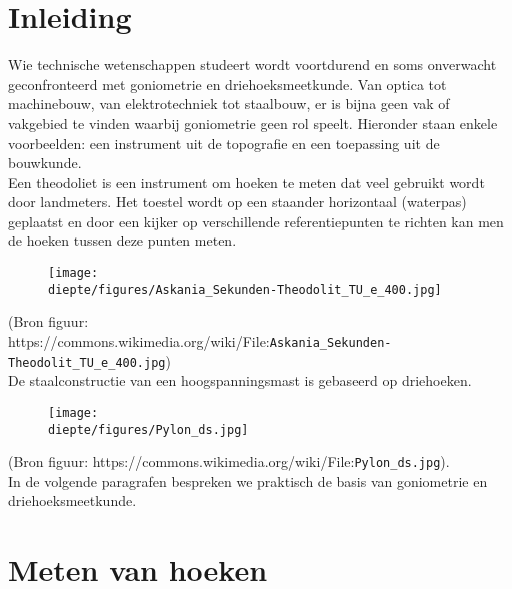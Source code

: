 \documentclass[a4paper,12pt]{article}
\newcommand{\diepte}{./}
\begin{document}
\section*{Inleiding}

Wie technische wetenschappen studeert wordt voortdurend en soms onverwacht geconfronteerd met goniometrie en driehoeksmeetkunde. Van optica tot machinebouw, van elektrotechniek tot staalbouw, er is bijna geen vak of vakgebied te vinden waarbij goniometrie geen rol speelt. Hieronder staan enkele voorbeelden: een instrument uit de topografie en een toepassing uit de bouwkunde.\\

Een theodoliet is een instrument om hoeken te meten dat veel gebruikt wordt door landmeters. Het toestel wordt op een staander horizontaal (waterpas) geplaatst en door een kijker op verschillende referentiepunten te richten kan men de hoeken tussen deze punten meten.

\begin{figure}[h]
\begin{center}
\texttt{[image: \\diepte/figures/Askania\_Sekunden-Theodolit\_TU\_e\_400.jpg]}
\end{center}
\end{figure}

(Bron figuur:\\ https://commons.wikimedia.org/wiki/File:\verb|Askania_Sekunden-Theodolit_TU_e_400.jpg|)\\

De staalconstructie van een hoogspanningsmast is gebaseerd op driehoeken.

\begin{figure}[h]
\begin{center}
\texttt{[image: \\diepte/figures/Pylon\_ds.jpg]}
\end{center}
\end{figure}

(Bron figuur: https://commons.wikimedia.org/wiki/File:\verb|Pylon_ds.jpg|).\\

In de volgende paragrafen bespreken we praktisch de basis van goniometrie en driehoeksmeetkunde.\\

\newpage

\section{Meten van hoeken}
\end{document}
